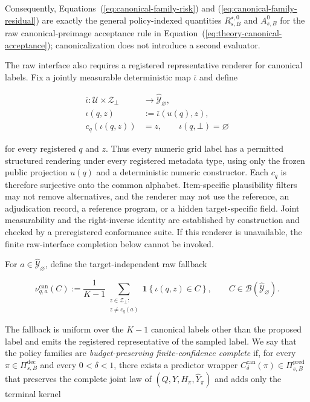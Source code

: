 \documentclass[10pt]{article} %
\renewcommand{\eqref}[1]{\textup{(\ref{#1})}}
\providecommand{\1}{\mathbf{1}}  %
\theoremstyle{remark}
\theoremstyle{definition}
\begin{document}
Consequently, Equations~\eqref{eq:canonical-family-risk} and
\eqref{eq:canonical-family-residual} are exactly the general policy-indexed
quantities $R_{s,B}^{\star,0}$ and $A_{s,B}^{0}$ for the raw canonical-preimage
acceptance rule in Equation~\eqref{eq:theory-canonical-acceptance};
canonicalization does not introduce a second evaluator.

The raw interface also requires a registered representative renderer for
canonical labels. Fix a jointly measurable deterministic map
$\overline\iota$ and define

\begin{equation}
\begin{aligned}
\overline\iota:
\mathcal U\times\mathcal Z_{\bot}
&\longrightarrow
\widehat{\mathcal Y}_{\varnothing},
\\
\iota(q,z)
&:=
\overline\iota\!\left(u(q),z\right),
\\
c_q\!\left(\iota(q,z)\right)
&=z,
\qquad
\iota(q,\bot)=\varnothing
\end{aligned}
\label{eq:canonical-representatives}
\end{equation}

for every registered $q$ and $z$.  Thus every numeric grid label has a
permitted structured rendering under every registered metadata type, using
only the frozen public projection $u(q)$ and a deterministic numeric
constructor.  Each $c_q$ is therefore surjective onto the common alphabet.
Item-specific plausibility filters may not remove alternatives, and the renderer
may not use the reference, an adjudication record, a reference program, or a
hidden target-specific field.  Joint measurability and the right-inverse
identity are established by construction and checked by a preregistered
conformance suite.  If this renderer is unavailable, the finite raw-interface
completion below cannot be invoked.

For $a\in\widehat{\mathcal Y}_{\varnothing}$, define the target-independent
raw fallback

\begin{equation}
\nu^{\mathrm{can}}_{q,a}(C)
:=
\frac{1}{K-1}
\sum_{\substack{z\in\mathcal Z_{\bot}:\\
z\neq c_q(a)}}
\mathbf 1\!\left\{\iota(q,z)\in C\right\},
\qquad
C\in\mathcal B(\widehat{\mathcal Y}_{\varnothing}).
\end{equation}

The fallback is uniform over the $K-1$ canonical labels other than the
proposed label and emits the registered representative of the sampled label.
We say that the policy families are \emph{budget-preserving finite-confidence
complete} if, for every $\pi\in\Pi_{s,B}^{\mathrm{dec}}$ and every
$0<\delta<1$, there exists a predictor wrapper
$C_\delta^{\mathrm{can}}(\pi)\in\Pi_{s,B}^{\mathrm{pred}}$ that preserves the
complete joint law of $(Q,Y,H_\pi,\widehat Y_\pi)$ and adds only the terminal
kernel
\end{document}
